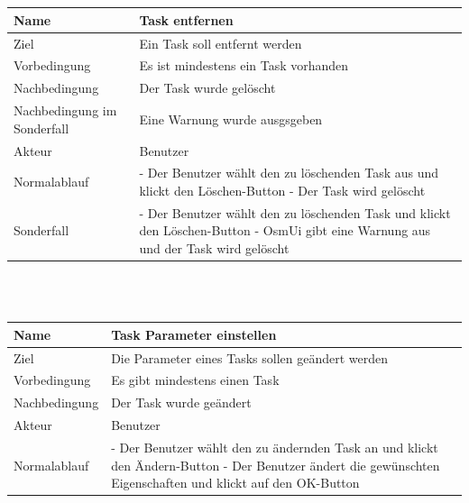 \documentclass[a4paper,10pt]{scrartcl}
\begin{document}
\\
\\
\begin{tabular}{|p{5cm}|p{10cm}|}
\hline Name & \textbf{Task entfernen} \\ 
\hline Ziel & Ein Task soll entfernt werden \\ 
\hline Vorbedingung & Es ist mindestens ein Task vorhanden \\ 
\hline Nachbedingung & Der Task wurde gelöscht \\ 
\hline Nachbedingung im Sonderfall & Eine Warnung wurde ausgsgeben \\ 
\hline Akteur & Benutzer \\ 
\hline Normalablauf & - Der Benutzer wählt den zu löschenden Task aus und klickt den Löschen-Button
\newline
- Der Task wird gelöscht
\\ 
\hline Sonderfall & - Der Benutzer wählt den zu löschenden Task und klickt den Löschen-Button
\newline
- OsmUi gibt eine Warnung aus und der Task wird gelöscht
 \\ 
\hline 
\end{tabular}  
\\
\\\begin{tabular}{|p{5cm}|p{10cm}|}
\hline Name & \textbf{Task Parameter einstellen} \\ 
\hline Ziel & Die Parameter eines Tasks sollen geändert werden\\ 
\hline Vorbedingung & Es gibt mindestens einen Task\\ 
\hline Nachbedingung & Der Task wurde geändert \\  
\hline Akteur & Benutzer \\ 
\hline Normalablauf & - Der Benutzer wählt den zu ändernden Task an und klickt den Ändern-Button
\newline
- Der Benutzer ändert die gewünschten Eigenschaften und klickt auf den OK-Button
\\ 
\hline 
\end{tabular} 
\end{document}
